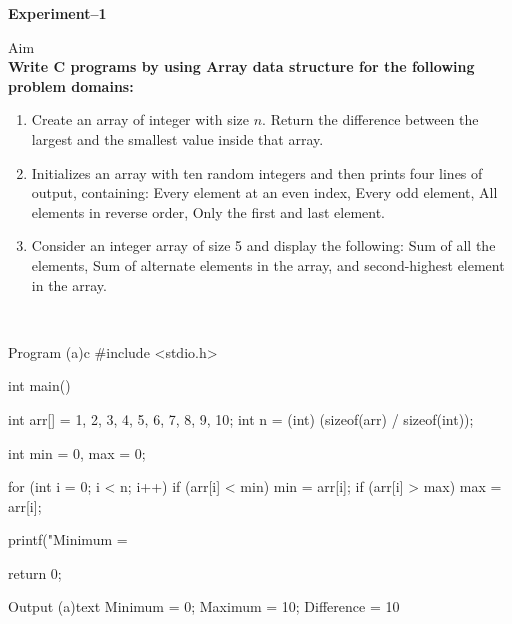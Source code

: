 \documentclass[11pt]{ipu-ai}
\renewcommand{\experiment}[3]{%
    \newpage%
    \begin{center}%
    \textbf{\Huge Experiment--#1}\\[30pt]%
    \end{center}%
    \begin{tabularsection}{Aim}%
    ~\\#2\\%
    \end{tabularsection}}%
\begin{document}
    \maketitle
    

    \experiment{1}{
        \noindent\textbf{Write C programs by using Array data structure for the following problem domains:}
        \begin{enumerate}[label=(\alph*)]
            \item Create an array of integer with size $n$.
            Return the difference between the largest and the smallest value inside that array.
            \item Initializes an array with ten random integers and then prints four lines of output, containing: Every
            element at an even index, Every odd element, All elements in reverse order, Only the first and last element.
            \item Consider an integer array of size 5 and display the following: Sum of all the elements, Sum of
            alternate elements in the array, and second-highest element in the array.
        \end{enumerate}\vspace{\onehalfspacing}%
    }\\%
    \begin{code}
        {Program (a)}{c}
#include <stdio.h>

int main() {
    int arr[] = {1, 2, 3, 4, 5, 6, 7, 8, 9, 10};
    int n = (int) (sizeof(arr) / sizeof(int));

    int min = 0, max = 0;

    for (int i = 0; i < n; i++) {
        if (arr[i] < min)
            min = arr[i];
        if (arr[i] > max)
            max = arr[i];
    }

    printf("Minimum = %

    return 0;
}
    \end{code}%
    \begin{code}
        {Output (a)}{text}
Minimum = 0; Maximum = 10; Difference = 10
    \end{code}
\end{document}
